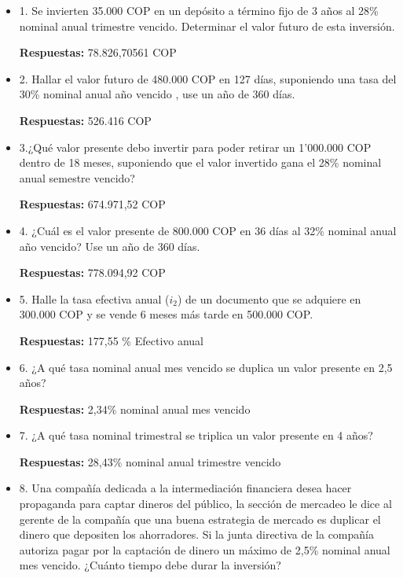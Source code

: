 \begin{itemize}

 \item 1. Se invierten 35.000 COP en un depósito a término fijo de 3 años al 28\%  nominal anual trimestre vencido. Determinar el valor futuro de esta inversión. 
 
 \textbf{Respuestas:}  78.826,70561 COP
       \medskip

 \item 2. Hallar el valor futuro de 480.000 COP en 127 días, suponiendo una tasa del 30\% nominal anual año vencido , use un año de 360 días.
 
  \textbf{Respuestas:}  526.416 COP
       \medskip

 \item 3.¿Qué valor presente debo invertir para poder retirar un 1’000.000 COP dentro de 18 meses, suponiendo que el valor invertido gana el 28\% nominal anual semestre vencido?
 
       \textbf{Respuestas:}  674.971,52 COP
       \medskip

 \item 4. ¿Cuál es el valor presente de 800.000 COP en 36 días al 32\% 
 nominal anual año vencido? Use un año de 360 días.
 
       \textbf{Respuestas:}  778.094,92 COP
       \medskip

 \item 5. Halle la tasa efectiva anual ($i_2$) de un documento que se adquiere en 300.000 COP y se vende 6 meses más tarde en 500.000 COP. 
 
    \textbf{Respuestas:}  177,55 \% Efectivo anual
       \medskip

 \item 6. ¿A qué tasa nominal anual mes vencido se duplica un valor presente en 2,5 años?  
 
       \textbf{Respuestas:} 2,34\% nominal anual mes vencido 
       \medskip

 \item 7. ¿A qué tasa nominal trimestral se triplica un valor presente en 4 años?
 
       \textbf{Respuestas:} 28,43\% nominal anual trimestre vencido  
       \medskip

 \item 8. Una compañía dedicada a la intermediación financiera desea hacer propaganda para captar dineros del público, la sección de mercadeo le dice al gerente de la compañía que una buena estrategia de mercado es duplicar el dinero que depositen los ahorradores. Si la junta directiva de la compañía autoriza pagar por la captación de dinero un máximo de 2,5\% nominal anual mes vencido. ¿Cuánto tiempo debe durar la inversión? 
 

\end{itemize}
